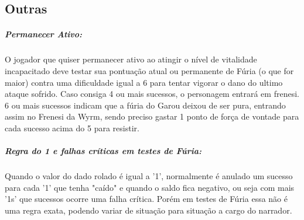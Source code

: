 \subsection{\bf Outras}



\subparagraph{\bf Permanecer Ativo:}
O jogador que quiser permanecer ativo ao atingir o nível de vitalidade incapacitado deve testar sua pontuação atual ou permanente de Fúria (o que for maior) contra uma dificuldade igual a 6 para tentar vigorar o dano do ultimo ataque sofrido. Caso consiga 4 ou mais sucessos, o personagem entrará em frenesi. 6 ou mais sucessos indicam que a fúria do Garou deixou de ser pura, entrando assim no Frenesi da Wyrm, sendo preciso gastar 1 ponto de força de vontade para cada sucesso acima do 5 para resistir.

\subparagraph{\bf Regra do 1 e falhas críticas em testes de Fúria:}
Quando o valor do dado rolado é igual a '1', normalmente é anulado um sucesso para cada '1' que tenha "caído" e quando o saldo fica negativo, ou seja com mais '1s' que sucessos ocorre uma falha crítica. Porém em testes de Fúria essa não é uma regra exata, podendo variar de situação para situação a cargo do narrador.

